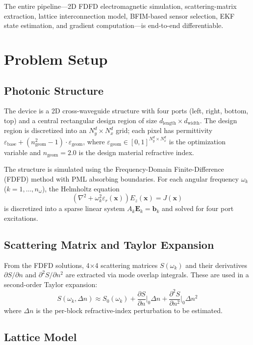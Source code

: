 \documentclass[11pt,a4paper]{article}
\begin{document}
The entire pipeline---2D FDFD electromagnetic simulation, scattering-matrix extraction, lattice interconnection model, BFIM-based sensor selection, EKF state estimation, and gradient computation---is end-to-end differentiable.

\section{Problem Setup}

\subsection{Photonic Structure}

The device is a 2D cross-waveguide structure with four ports (left, right, bottom, top) and a central rectangular design region of size $d_{\text{length}} \times d_{\text{width}}$.  The design region is discretized into an $N_y^d \times N_x^d$ grid; each pixel has permittivity $\varepsilon_{\text{base}} + (n_{\text{geom}}^2 - 1) \cdot \varepsilon_{\text{geom}}$, where $\varepsilon_{\text{geom}} \in [0,1]^{N_y^d \times N_x^d}$ is the optimization variable and $n_{\text{geom}} = 2.0$ is the design material refractive index.

The structure is simulated using the Frequency-Domain Finite-Difference (FDFD) method with PML absorbing boundaries.  For each angular frequency $\omega_k$ ($k = 1, \ldots, n_\omega$), the Helmholtz equation
\[
  (\nabla^2 + \omega_k^2 \varepsilon_r(\bm{x})) E_z(\bm{x}) = J(\bm{x})
\]
is discretized into a sparse linear system $A_k \bm{E}_k = \bm{b}_k$ and solved for four port excitations.

\subsection{Scattering Matrix and Taylor Expansion}

From the FDFD solutions, 4$\times$4 scattering matrices $S(\omega_k)$ and their derivatives $\partial S/\partial n$ and $\partial^2 S/\partial n^2$ are extracted via mode overlap integrals.  These are used in a second-order Taylor expansion:
\[
  S(\omega_k, \Delta n) \approx S_0(\omega_k) + \frac{\partial S}{\partial n}\bigg|_0 \Delta n + \frac{\partial^2 S}{\partial n^2}\bigg|_0 \Delta n^2
\]
where $\Delta n$ is the per-block refractive-index perturbation to be estimated.

\subsection{Lattice Model}
\end{document}
